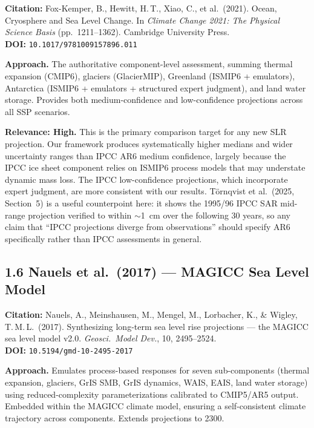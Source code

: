\documentclass[11pt]{article}
\begin{document}
\noindent\textbf{Citation:} Fox-Kemper, B., Hewitt, H.\,T., Xiao, C.,
et al.\ (2021). Ocean, Cryosphere and Sea Level Change. In
\textit{Climate Change 2021: The Physical Science Basis} (pp.\ 1211--1362).
Cambridge University Press.\\
\textbf{DOI:} \texttt{10.1017/9781009157896.011}

\noindent\textbf{Approach.} The authoritative component-level assessment,
summing thermal expansion (CMIP6), glaciers (GlacierMIP), Greenland
(ISMIP6 + emulators), Antarctica (ISMIP6 + emulators + structured expert
judgment), and land water storage. Provides both medium-confidence and
low-confidence projections across all SSP scenarios.

\noindent\textbf{Relevance: High.} This is the primary comparison target
for any new SLR projection. Our framework produces systematically higher
medians and wider uncertainty ranges than IPCC AR6 medium confidence,
largely because the IPCC ice sheet component relies on ISMIP6 process
models that may understate dynamic mass loss. The IPCC low-confidence
projections, which incorporate expert judgment, are more consistent with our
results. Törnqvist et al.\ (2025, Section~5) is a useful counterpoint here:
it shows the 1995/96 IPCC SAR mid-range projection verified to within
$\sim$1~cm over the following 30 years, so any claim that ``IPCC projections
diverge from observations'' should specify AR6 specifically rather than
IPCC assessments in general.

\subsection*{1.6 Nauels et al.\ (2017) --- MAGICC Sea Level Model}

\noindent\textbf{Citation:} Nauels, A., Meinshausen, M., Mengel, M.,
Lorbacher, K., \& Wigley, T.\,M.\,L.\ (2017). Synthesizing long-term sea
level rise projections --- the MAGICC sea level model v2.0.
\textit{Geosci.\ Model Dev.}, 10, 2495--2524.\\
\textbf{DOI:} \texttt{10.5194/gmd-10-2495-2017}

\noindent\textbf{Approach.} Emulates process-based responses for seven
sub-components (thermal expansion, glaciers, GrIS SMB, GrIS dynamics, WAIS,
EAIS, land water storage) using reduced-complexity parameterizations
calibrated to CMIP5/AR5 output. Embedded within the MAGICC climate model,
ensuring a self-consistent climate trajectory across components. Extends
projections to 2300.
\end{document}
